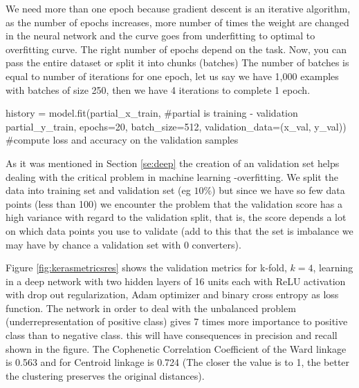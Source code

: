 \documentclass[11pt]{article}
\theoremstyle{definition}
\theoremstyle{remark}
\begin{document}
{We need more than one epoch because gradient descent is an iterative algorithm, as the number of epochs increases, more number of times the weight are changed in the neural network and the curve goes from underfitting to optimal to overfitting curve. The right number of epochs depend on the task. Now, you can pass the entire dataset or split it into chunks (batches)
The number of batches is equal to number of iterations for one epoch, let us say we have 1,000 examples with batches of size 250, then we have 4 iterations to complete 1 epoch.

\begin{code}[caption=fitting deep network, label=deepkerasfit]
history = model.fit(partial_x_train, #partial is training - validation
                    partial_y_train, 
                    epochs=20,
                    batch_size=512,
                    validation_data=(x_val, y_val)) 
                    #compute loss and accuracy on the validation samples
\end{code}

As it was mentioned in Section \ref{se:deep} the creation of an validation set helps dealing with the critical problem in machine learning -overfitting. We split the data into training set and validation set (eg $10\%$) but since we have so few data points (less than 100) we encounter the problem that the validation score has a high variance with regard to the validation split, that is, the score depends a lot on which data points you use to validate (add to this that the set is imbalance we may have by chance a validation set with 0 converters).

Figure \ref{fig:kerasmetricsres} shows the validation metrics for k-fold, $k=4$, learning in a deep network with two hidden layers of 16 units each with ReLU activation with drop out regularization, Adam optimizer and binary cross entropy as loss function. The network in order to deal with the unbalanced problem (underrepresentation of positive class) gives 7 times more importance to positive class than to negative class. this will have consequences in precision and recall shown in the figure. The Cophenetic Correlation Coefficient of the Ward linkage is 0.563 and for Centroid linkage is 0.724 (The closer the value is to 1, the better the clustering preserves the original distances).

}
\end{document}
